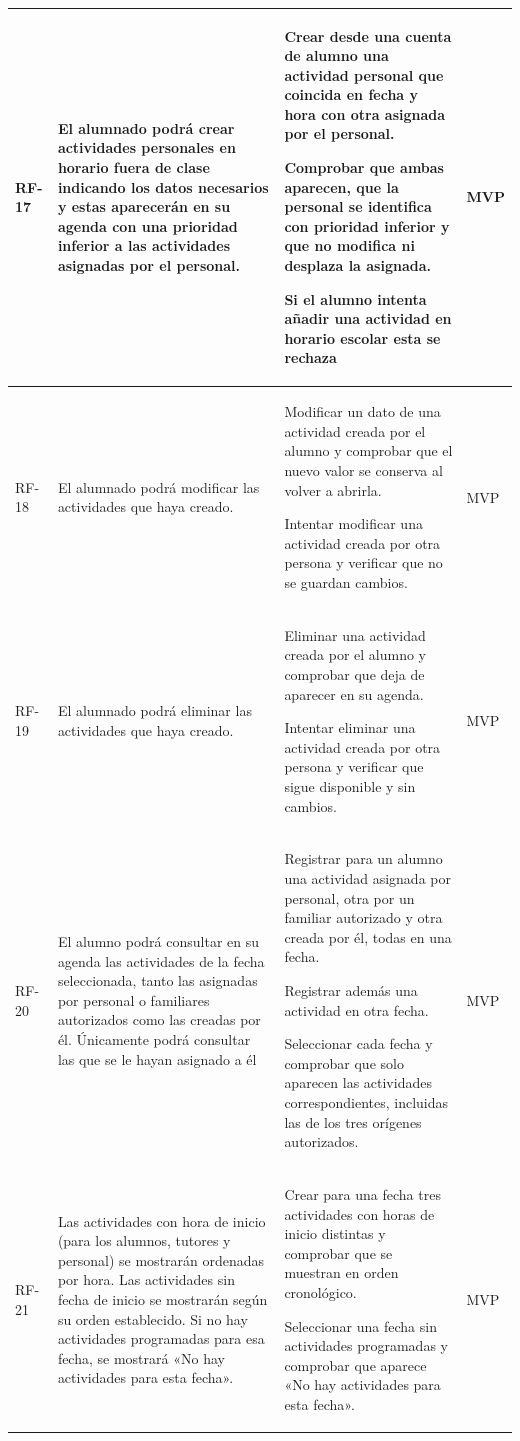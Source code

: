 \begin{longtable}{|>{\raggedright\arraybackslash}p{1cm}|>{\raggedright\arraybackslash}p{6cm}|>{\criterioinicio}p{5.9cm}<{\criteriofin}|>{\centering\arraybackslash}p{1.8cm}|}
\hline
\hypertarget{rf-17}{}RF-17 & El alumnado podrá crear actividades personales en horario fuera de clase indicando los datos necesarios y estas aparecerán en su agenda con una prioridad inferior a las actividades asignadas por el personal. & Crear desde una cuenta de alumno una actividad personal que coincida en fecha y hora con otra asignada por el personal. \item Comprobar que ambas aparecen, que la personal se identifica con prioridad inferior y que no modifica ni desplaza la asignada. \item Si el alumno intenta añadir una actividad en horario escolar esta se rechaza & \textcolor{cambioCatalogo}{MVP} \\
\hline
\hypertarget{rf-18}{}RF-18 & El alumnado podrá modificar las actividades que haya creado. & Modificar un dato de una actividad creada por el alumno y comprobar que el nuevo valor se conserva al volver a abrirla. \item Intentar modificar una actividad creada por otra persona y verificar que no se guardan cambios. & MVP \\
\hline
\hypertarget{rf-19}{}RF-19 & El alumnado podrá eliminar las actividades que haya creado. & Eliminar una actividad creada por el alumno y comprobar que deja de aparecer en su agenda. \item Intentar eliminar una actividad creada por otra persona y verificar que sigue disponible y sin cambios. & MVP \\
\hline
\hypertarget{rf-20}{}RF-20 & El alumno podrá consultar en su agenda las actividades de la fecha seleccionada, tanto las asignadas por personal o familiares autorizados como las creadas por él. Únicamente podrá consultar las que se le hayan asignado a él & Registrar para un alumno una actividad asignada por personal, otra por un familiar autorizado y otra creada por él, todas en una fecha. \item Registrar además una actividad en otra fecha. \item Seleccionar cada fecha y comprobar que solo aparecen las actividades correspondientes, incluidas las de los tres orígenes autorizados. & MVP \\
\hline
\hypertarget{rf-21}{}RF-21 & Las actividades con hora de inicio (para los alumnos, tutores y personal) se mostrarán ordenadas por hora. Las actividades sin fecha de inicio se mostrarán según su orden establecido. Si no hay actividades programadas para esa fecha, se mostrará «No hay actividades para esta fecha». & Crear para una fecha tres actividades con horas de inicio distintas y comprobar que se muestran en orden cronológico. \item Seleccionar una fecha sin actividades programadas y comprobar que aparece «No hay actividades para esta fecha». & MVP \\

\end{longtable}
